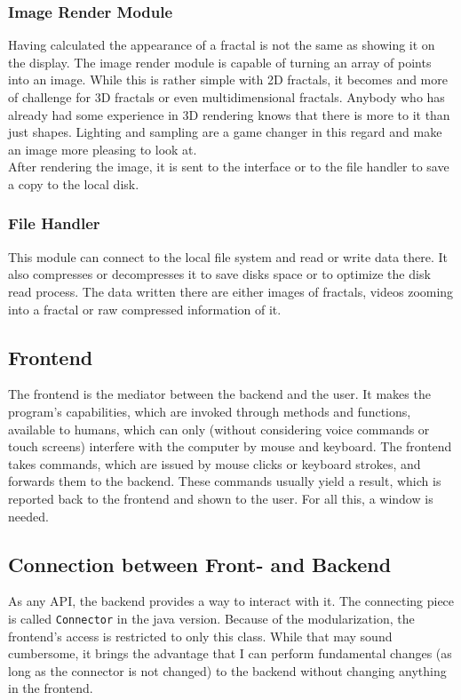 \documentclass[10pt,a4paper,titlepage]{article}
\begin{document}
	\subsubsection{Image Render Module}
	Having calculated the appearance of a fractal is not the same as showing it on the display. The image render module is capable of turning an array of points into an image. While this is rather simple with 2D fractals, it becomes and more of challenge for 3D fractals or even multidimensional fractals. Anybody who has already had some experience in 3D rendering knows that there is more to it than just shapes. Lighting and sampling are a game changer in this regard and make an image more pleasing to look at.\\
	After rendering the image, it is sent to the interface or to the file handler to save a copy to the local disk.
	\subsubsection{File Handler}
	This module can connect to the local file system and read or write data there. It also compresses or decompresses it to save disks space or to optimize the disk read process. The data written there are either images of fractals, videos zooming into a fractal or raw compressed information of it.
	\subsection{Frontend}
	The frontend is the mediator between the backend and the user. It makes the program's capabilities, which are invoked through methods and functions, available to humans, which can only (without considering voice commands or touch screens) interfere with the computer by mouse and keyboard. The frontend takes commands, which are issued by mouse clicks or keyboard strokes, and forwards them to the backend. These commands usually yield a result, which is reported back to the frontend and shown to the user. For all this, a window is needed.
	\subsection{Connection between Front- and Backend}
	As any API, the backend provides a way to interact with it. The connecting piece is called \verb|Connector| in the java version. Because of the modularization, the frontend's access is restricted to only this class. While that may sound cumbersome, it brings the advantage that I can perform fundamental changes (as long as the connector is not changed) to the backend without changing anything in the frontend.
	
\end{document}
